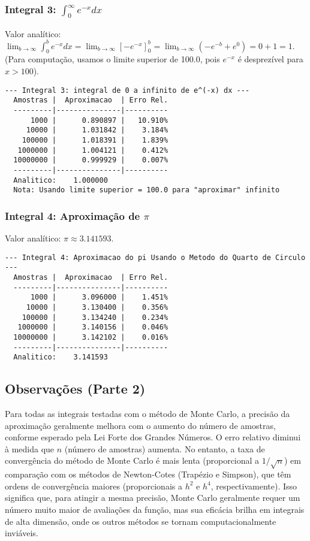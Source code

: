 \documentclass{article}
\begin{document}
\subsubsection{Integral 3: $\int_{0}^{\infty}e^{-x}dx$}
Valor analítico: $\lim_{b \to \infty} \int_{0}^{b} e^{-x}dx = \lim_{b \to \infty} [-e^{-x}]_{0}^{b} = \lim_{b \to \infty}(-e^{-b} + e^{0}) = 0 + 1 = 1$.
\\
(Para computação, usamos o limite superior de 100.0, pois $e^{-x}$ é desprezível para $x > 100$).
\begin{verbatim}
--- Integral 3: integral de 0 a infinito de e^(-x) dx ---
  Amostras |  Aproximacao  | Erro Rel.
  ---------|---------------|----------
      1000 |      0.890897 |   10.910%
     10000 |      1.031842 |    3.184%
    100000 |      1.018391 |    1.839%
   1000000 |      1.004121 |    0.412%
  10000000 |      0.999929 |    0.007%
  ---------|---------------|----------
  Analitico:    1.000000
  Nota: Usando limite superior = 100.0 para "aproximar" infinito
\end{verbatim}

\subsubsection{Integral 4: Aproximação de $\pi$}
Valor analítico: $\pi \approx 3.141593$.
\begin{verbatim}
--- Integral 4: Aproximacao do pi Usando o Metodo do Quarto de Circulo ---
  Amostras |  Aproximacao  | Erro Rel.
  ---------|---------------|----------
      1000 |      3.096000 |    1.451%
     10000 |      3.130400 |    0.356%
    100000 |      3.134240 |    0.234%
   1000000 |      3.140156 |    0.046%
  10000000 |      3.142102 |    0.016%
  ---------|---------------|----------
  Analitico:    3.141593
\end{verbatim}

\subsection{Observações (Parte 2)}
Para todas as integrais testadas com o método de Monte Carlo, a precisão da aproximação geralmente melhora com o aumento do número de amostras, conforme esperado pela Lei Forte dos Grandes Números. O erro relativo diminui à medida que $n$ (número de amostras) aumenta. No entanto, a taxa de convergência do método de Monte Carlo é mais lenta (proporcional a $1/\sqrt{n}$) em comparação com os métodos de Newton-Cotes (Trapézio e Simpson), que têm ordens de convergência maiores (proporcionais a $h^2$ e $h^4$, respectivamente). Isso significa que, para atingir a mesma precisão, Monte Carlo geralmente requer um número muito maior de avaliações da função, mas sua eficácia brilha em integrais de alta dimensão, onde os outros métodos se tornam computacionalmente inviáveis.
\end{document}
